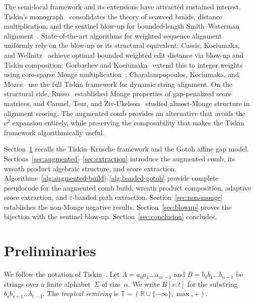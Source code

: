 \documentclass[11pt, a4paper]{article}
\theoremstyle{definition}
\theoremstyle{remark}
\newcommand{\Trop}{\mathbb{T}}
\newcommand{\Real}{\mathbb{R}}
\begin{document}
\begin{sloppypar}
The semi-local framework and its extensions have attracted
sustained interest.
Tiskin's monograph~\cite{tiskin2022book} consolidates the theory
of seaweed braids, distance multiplication, and the sentinel
blow-up for bounded-length Smith--Waterman
alignment~\cite{tiskin2019bounded}.  State-of-the-art algorithms
for weighted sequence alignment uniformly rely on the blow-up or
its structural equivalent:
Cassis, Kociumaka, and Wellnitz~\cite{cassis2023weighted} achieve
optimal bounded weighted edit distance via blow-up and Tiskin
composition; Gorbachev and
Kociumaka~\cite{gorbachev2025bounded} extend this to integer
weights using core-sparse Monge
multiplication~\cite{gawrychowski2025coresparse};
Charalampopoulos, Kociumaka, and
Mozes~\cite{charalampopoulos2020dynamic} use the full Tiskin
framework for dynamic string alignment.  On the structural side,
Russo~\cite{russo2012monge} established Monge properties of
gap-penalized score matrices, and Carmel, Tsur, and
Ziv-Ukelson~\cite{carmel2016almost} studied almost-Monge
structure in alignment scoring.  The augmented comb provides an
alternative that avoids the $\nu^2$ expansion entirely, while
preserving the composability that makes the Tiskin framework
algorithmically useful.
\end{sloppypar}

Section~\ref{sec:prelim} recalls the Tiskin--Krusche framework and the Gotoh affine gap model.
Sections~\ref{sec:augmented}--\ref{sec:extraction} introduce the augmented comb, its wreath product algebraic structure, and score extraction.
Algorithms~\ref{alg:augmented-build}--\ref{alg:banded-gotoh} provide complete pseudocode for the augmented comb build, wreath product composition, adaptive score extraction, and $\varepsilon$-banded path extraction.
Section~\ref{sec:non-monge} establishes the non-Monge negative results.  Section~\ref{sec:blowup} proves the bijection with the sentinel blow-up.  Section~\ref{sec:conclusion} concludes.

\section{Preliminaries}\label{sec:prelim}

We follow the notation of Tiskin~\cite{tiskin2008semi}.  Let
$A = a_0 a_1 \dots a_{m-1}$ and $B = b_0 b_1 \dots b_{n-1}$ be
strings over a finite alphabet~$\Sigma$ of size~$\alpha$.
We
write $B[s{:}t]$ for the substring $b_s b_{s+1} \dots b_{t-1}$.
The \emph{tropical semiring} is
$\Trop = (\Real \cup \{-\infty\}, \max, +)$.
\end{document}
